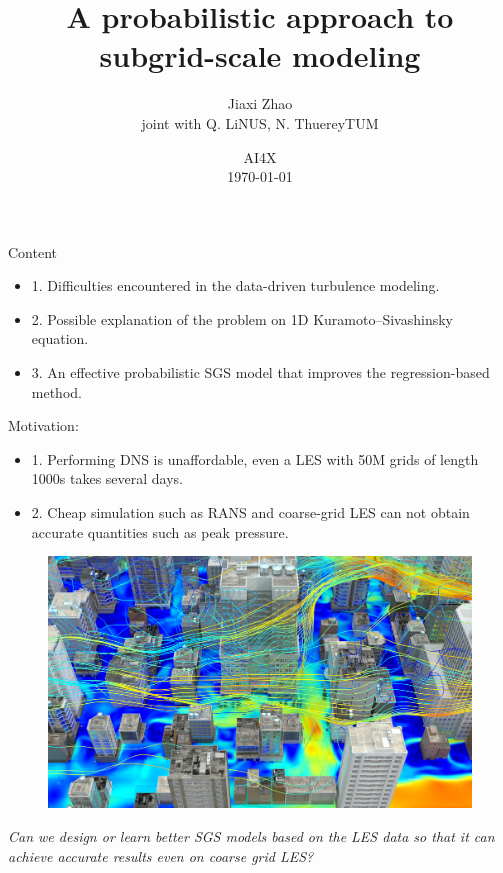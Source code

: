 \documentclass[paper slide]{beamer}
\title[Probabilistic SGS modeling]{A probabilistic approach to 
		subgrid-scale modeling}
\author[J. Zhao]{Jiaxi Zhao \\ \small joint with Q. Li\@ NUS, N. Thuerey\@ TUM}
\date[\today]{AI4X \\ \today}
\begin{document}
\par \setlength{\parindent}{2em}

\begin{frame}
\titlepage
\end{frame}


\begin{frame}{Content}
	\begin{itemize}
		\item 1. Difficulties encountered in the data-driven turbulence modeling.
		\item 2. Possible explanation of the problem on 1D Kuramoto–Sivashinsky
		equation.
		\item 3. An effective probabilistic SGS model that improves the
		regression-based method.
	\end{itemize}
\end{frame}


\begin{frame}{Motivation:}
	\begin{itemize}
		\item 1. Performing DNS is unaffordable, even a LES with 50M grids of length 1000s takes several days.
		\item 2. Cheap simulation such as RANS and coarse-grid LES can not obtain accurate quantities such as peak pressure.
	\end{itemize}
	\begin{figure}[ht]
		\centering
		\includegraphics[width=.6\linewidth]{fig/urban_environment.jpeg}
	\end{figure}
	\textit{Can we {\color{red}design or learn better SGS models} based on the LES data so that it can achieve accurate
	results even {\color{red}on coarse grid LES?}}
\end{frame}
\end{document}
